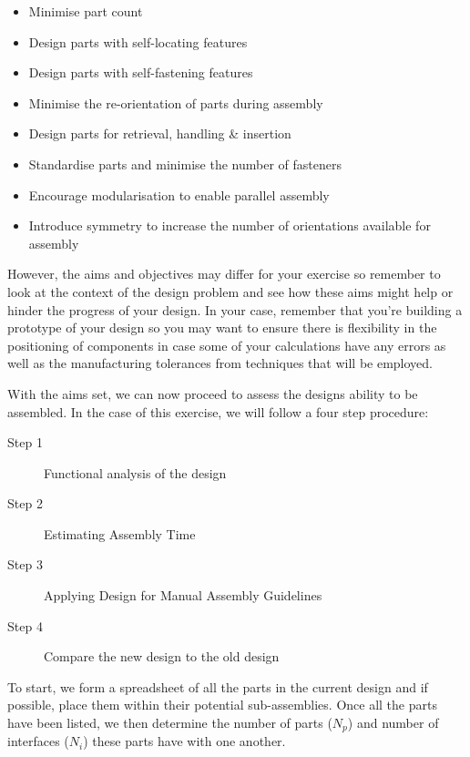 \begin{itemize}
\item Minimise part count
\item Design parts with self-locating features
\item Design parts with self-fastening features
\item Minimise the re-orientation of parts during assembly
\item Design parts for retrieval, handling \& insertion
\item Standardise parts and minimise the number of fasteners
\item Encourage modularisation to enable parallel assembly
\item Introduce symmetry to increase the number of orientations available for assembly
\end{itemize}

However, the aims and objectives may differ for your exercise so remember to look at the context of the design problem and see how these aims might help or hinder the progress of your design. In your case, remember that you're building a prototype of your design so you may want to ensure there is flexibility in the positioning of components in case some of your calculations have any errors as well as the manufacturing tolerances from techniques that will be employed.

With the aims set, we can now proceed to assess the designs ability to be assembled. In the case of this exercise, we will follow a four step procedure:

\begin{description}
  \item[Step 1] Functional analysis of the design
  \item[Step 2] Estimating Assembly Time
  \item[Step 3] Applying Design for Manual Assembly Guidelines
  \item[Step 4] Compare the new design to the old design
\end{description}


To start, we form a spreadsheet of all the parts in the current design and if possible, place them within their potential sub-assemblies. Once all the parts have been listed, we then determine the number of parts ($N_p$) and number of interfaces ($N_i$) these parts have with one another. 

